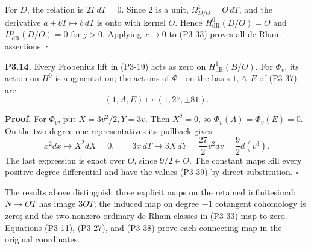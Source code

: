 \documentclass[
]{article}
\begin{document}
For \(D\), the relation is \(2T\,dT=0\). Since 2 is a unit,
\(\Omega^1_{D/O}=O\,dT\), and the derivative \(a+bT\mapsto b\,dT\) is
onto with kernel \(O\). Hence \(H^0_{\mathrm{dR}}(D/O)=O\) and
\(H^j_{\mathrm{dR}}(D/O)=0\) for \(j>0\). Applying \(x\mapsto0\) to
(P3-33) proves all de Rham assertions. \(\square\)

\textbf{P3.14.} Every Frobenius lift in (P3-19) acts as zero on
\(H^1_{\mathrm{dR}}(B/O)\). For \(\Phi_v\), its action on \(H^0\) is
augmentation; the actions of \(\Phi_\pm\) on the basis \(1,A,E\) of
(P3-37) are \[
(1,A,E)\longmapsto(1,27,\pm81).
\tag{P3-39}
\]

\textbf{Proof.} For \(\Phi_v\), put \(X=3v^2/2,Y=3v\). Then \(X^2=0\),
so \(\Phi_v(A)=\Phi_v(E)=0\). On the two degree-one representatives its
pullback gives \[
x^2dx\longmapsto X^2dX=0,\qquad
3x\,dT\longmapsto3X\,dY
=\frac{27}{2}v^2dv=\frac92d(v^3).
\] The last expression is exact over \(O\), since \(9/2\in O\). The
constant maps kill every positive-degree differential and have the
values (P3-39) by direct substitution. \(\square\)

The results above distinguish three explicit maps on the retained
infinitesimal: \(N\to OT\) has image \(3OT\); the induced map on degree
\(-1\) cotangent cohomology is zero; and the two nonzero ordinary de
Rham classes in (P3-33) map to zero. Equations (P3-11), (P3-27), and
(P3-38) prove each connecting map in the original coordinates.
\end{document}

